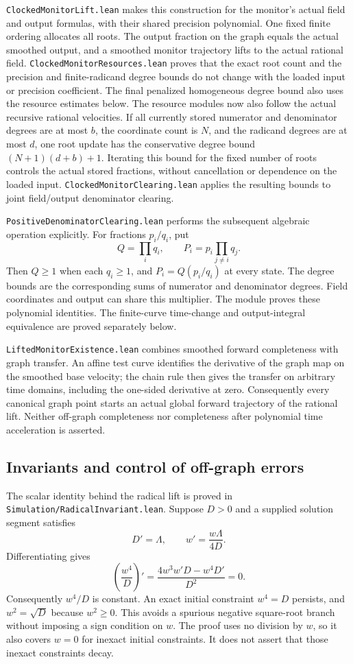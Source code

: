 \documentclass[11pt]{article}
\newcommand{\code}[1]{{\small\nolinkurl{#1}}}
\begin{document}
\code{ClockedMonitorLift.lean} makes this construction for the monitor's
actual field and output formulas, with their shared precision polynomial.
One fixed finite ordering allocates all roots. The output fraction on the
graph equals the actual smoothed output, and a smoothed monitor trajectory
lifts to the actual rational field. \code{ClockedMonitorResources.lean}
proves that the exact root count and the precision and finite-radicand
degree bounds do not change with the loaded input or precision coefficient.
The final penalized homogeneous degree bound also uses the resource
estimates below.
The resource modules now also follow the actual recursive rational
velocities. If all currently stored numerator and denominator degrees are
at most $b$, the coordinate count is $N$, and the radicand degrees are at
most $d$, one root update has the conservative degree bound
$(N+1)(d+b)+1$. Iterating this bound for the fixed number of roots controls
the actual stored fractions, without cancellation or dependence on the
loaded input. \code{ClockedMonitorClearing.lean} applies the resulting
bounds to joint field/output denominator clearing.

\code{PositiveDenominatorClearing.lean} performs the subsequent algebraic
operation explicitly. For fractions $p_i/q_i$, put
\[
 Q=\prod_i q_i,\qquad P_i=p_i\prod_{j\ne i}q_j.
\]
Then $Q\ge1$ when each $q_i\ge1$, and $P_i=Q(p_i/q_i)$ at every state.
The degree bounds are the corresponding sums of numerator and denominator
degrees. Field coordinates and output can share this multiplier. The
module proves these polynomial identities. The finite-curve time-change
and output-integral equivalence are proved separately below.

\code{LiftedMonitorExistence.lean} combines smoothed forward completeness
with graph transfer. An affine test curve identifies the derivative of
the graph map on the smoothed base velocity; the chain rule then gives
the transfer on arbitrary time domains, including the one-sided derivative
at zero. Consequently every canonical graph point starts an actual global
forward trajectory of the rational lift. Neither off-graph completeness
nor completeness after polynomial time acceleration is asserted.

\subsection{Invariants and control of off-graph errors}

The scalar identity behind the radical lift is proved in
\code{Simulation/RadicalInvariant.lean}. Suppose $D>0$ and a supplied
solution segment satisfies
\[
 D'=\Lambda,\qquad w'=\frac{w\Lambda}{4D}.
\]
Differentiating gives
\[
 \left(\frac{w^4}{D}\right)'
 =\frac{4w^3w'D-w^4D'}{D^2}=0.
\]
Consequently $w^4/D$ is constant. An exact initial constraint $w^4=D$
persists, and $w^2=\sqrt D$ because $w^2\ge0$. This avoids a spurious
negative square-root branch without imposing a sign condition on $w$.
The proof uses no division by $w$, so it also covers $w=0$ for inexact
initial constraints. It does not assert that those inexact constraints
decay.
\end{document}
